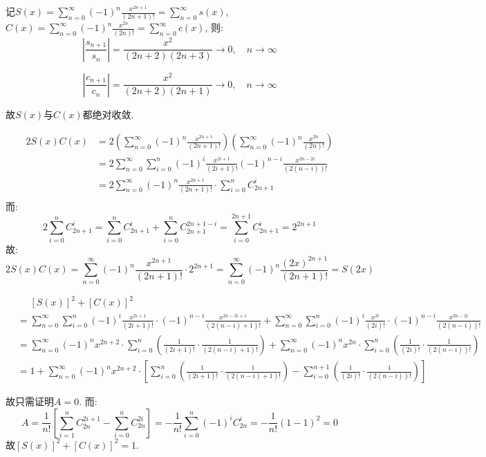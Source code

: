 
\begin{solution}
    记\(S(x) = \sum_{n=0}^{\infty} (-1)^n \frac{x^{2n+1}}{(2n+1)!} =
    \sum_{n=0}^{\infty} s(x)\), \(C(x) = \sum_{n=0}^{\infty} (-1)^n
    \frac{x^{2n}}{(2n)!} = \sum_{n=0}^{\infty} c(x)\), 则:
    \[
        \left\vert \frac{s_{n+1}}{s_{n}} \right\vert =
        \frac{x^2}{(2n+2)(2n+3)} \to 0, \quad n \to \infty
    \]

    \[
        \left\vert \frac{c_{n+1}}{c_{n}} \right\vert =
        \frac{x^2}{(2n+2)(2n+1)} \to 0, \quad n \to \infty
    \]

    故\(S(x)\)与\(C(x)\)都绝对收敛.

    \begin{align*}
        2S(x)C(x) & = 2\left( \sum_{n=0}^{\infty} (-1)^n
        \frac{x^{2n+1}}{(2n+1)!} \right)  \left(  \sum_{n=0}^{\infty} (-1)^n
        \frac{x^{2n}}{(2n)!} \right)
        \\
        & = 2 \sum_{n=0}^{\infty} \sum_{i=0}^{n} (-1)^{i}
        \frac{x^{2i+1}}{(2i+1)!} (-1)^{n-i}
        \frac{x^{2n-2i}}{(2(n-i))!}           \\
        & = 2 \sum_{n=0}^{\infty} (-1)^n \frac{x^{2n+1}}{(2n+1)!} \cdot
        \sum_{i=0}^{n} C^{i}_{2n+1}
        \\
    \end{align*}
    而:
    \[
        2 \sum_{i=0}^{n} C^{i}_{2n+1} = \sum_{i=0}^{n} C^{i}_{2n+1} +
        \sum_{i=0}^{n} C^{2n+1-i}_{2n+1}  = \sum_{i=0}^{2n+1}
        C^{i}_{2n+1} = 2^{2n+1}
    \]
    故:
    \[
        2S(x)C(x) = \sum_{n=0}^{\infty} (-1)^n \frac{x^{2n+1}}{(2n+1)!}
        \cdot 2^{2n+1} = \sum_{n=0}^{\infty} (-1)^n
        \frac{(2x)^{2n+1}}{(2n+1)!} = S(2x)
    \]

    \begin{align*}
        &\mathrel{\phantom{=}} [S(x)]^2+[C(x)]^2\\
        & = \sum_{n=0}^{\infty} \sum_{i=0}^{n} (-1)^{i}
        \frac{x^{2i+1}}{(2i+1)!} \cdot (-1)^{n-i}
        \frac{x^{2n-2i+1}}{(2(n-i)+1)!}
        + \sum_{n=0}^{\infty} \sum_{i=0}^{n} (-1)^{i}
        \frac{x^{2i}}{(2i)!} \cdot (-1)^{n-i} \frac{x^{2n -
        2i}}{(2(n-i))!}      \\
        & = \sum_{n=0}^{\infty} (-1)^n x^{2n+2} \cdot \sum_{i=0}^{n}
        \left( \frac{1}{(2i+1)!} \cdot \frac{1}{(2(n-i)+1)!} \right) +
        \sum_{n=0}^{\infty} (-1)^n x^{2n} \cdot \sum_{i=0}^{n}
        \left( \frac{1}{(2i)!} \cdot \frac{1}{(2(n-i))!} \right)
        \\
        & = 1 + \sum_{n=0}^{\infty} (-1)^n x^{2n+2}
        \cdot
        \left[ \sum_{i=0}^{n} \left( \frac{1}{(2i+1)!} \cdot
            \frac{1}{(2(n-i)+1)!} \right)
            - \sum_{i=0}^{n+1} \left( \frac{1}{(2i)!} \cdot
        \frac{1}{(2(n-i))!} \right) \right]
    \end{align*}

    故只需证明\(A=0\).
    而:
    \[
        A=\frac{1}{n!}\left[ \sum_{i=1}^{n} C^{2i+1}_{2n} -
        \sum_{i=0}^{n} C^{2i}_{2n} \right] = - \frac{1}{n!}
        \sum_{i=0}^{n} (-1)^i C^{i}_{2n} =
        - \frac{1}{n!} \left( 1 - 1 \right)^2
        =0
    \]
    故\([S(x)]^2+[C(x)]^2=1\).
\end{solution}
